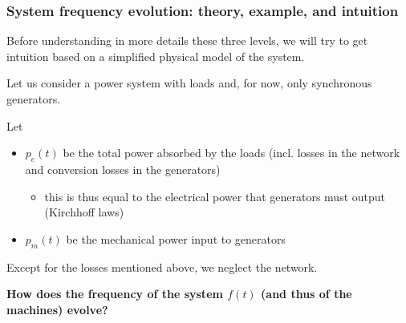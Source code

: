       

\begin{frame}
    \frametitle{System frequency evolution: theory, example, and intuition}
    Before understanding in more details these three levels, we will try to get intuition based on a simplified physical model of the system.
    
    Let us consider a power system with loads and, for now, only synchronous generators.

    Let
    \begin{itemize}
        \item $p_e(t)$ be the total power absorbed by the loads (incl. losses in the network and conversion losses in the generators)
        \begin{itemize}
            \item this is thus equal to the electrical power that generators must output (Kirchhoff laws)
        \end{itemize}
        \item $p_m(t)$ be the mechanical power input to generators
    \end{itemize}
    Except for the losses mentioned above, we neglect the network.

    \textbf{How does the frequency of the system $f(t)$ (and thus of the machines) evolve?}
\end{frame}


